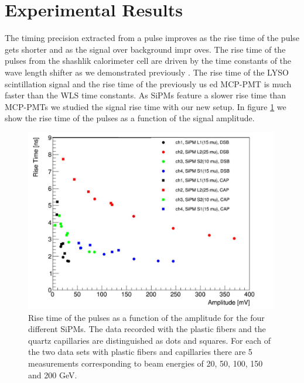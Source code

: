 \section{Experimental Results}
The timing precision extracted from a pulse improves as the rise time of the pulse gets shorter and as the signal over background impr
oves. The rise time of the pulses from the shashlik calorimeter cell are driven by the time constants of the wave length shifter
as we demonstrated previously \cite{lysotiming}. The rise time of the LYSO scintillation signal and the rise time of the previously us
ed MCP-PMT is much faster than the WLS time constants.                                                                  
As SiPMs feature a slower rise time than MCP-PMTs we studied the signal rise time with our new setup.
In figure \ref{RiseTime} we show the rise time of the pulses as a function of the signal amplitude. 
%
\begin{figure}[htbc]
\includegraphics[width=0.99\textwidth]{RiseTime.pdf}
\caption{\label{RiseTime}Rise time of the pulses as a function of the amplitude for the four different SiPMs.
 The data recorded with the plastic fibers and the quartz capillaries are distinguished as dots and squares. For each of the two data 
sets with plastic fibers and capillaries there are 5 measurements corresponding to beam energies of 20, 50, 100, 150 and 200 GeV.}
\end{figure}
